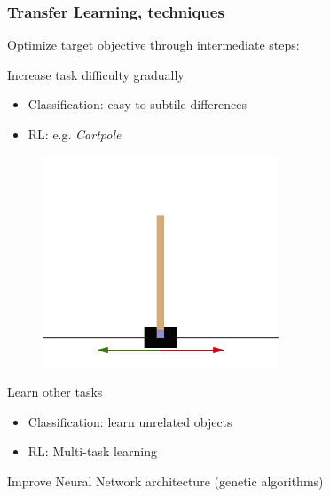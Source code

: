 \begin{frame}\frametitle{Transfer Learning, techniques}
   \begin{itemize}
      \item Optimize target objective through intermediate steps:
      \begin{itemize}
         \begin{minipage}{0.7\linewidth}
            \item Increase task difficulty gradually
            \begin{itemize}
               \item Classification: easy to subtile differences
               \item RL: e.g. \textit{Cartpole}
            \end{itemize}
         \end{minipage}
         \begin{minipage}{0.28\linewidth}
            \begin{figure}[H]
               \includegraphics[scale=.27]{../images/illustrations/model_cartpole.png}
            \end{figure}
         \end{minipage}
   
         \item Learn other tasks
         \begin{itemize}
            \item Classification: learn unrelated objects
            \item RL: Multi-task learning
         \end{itemize}
         \item Improve Neural Network architecture (genetic algorithms)
      \end{itemize}
   \end{itemize}


\end{frame}
